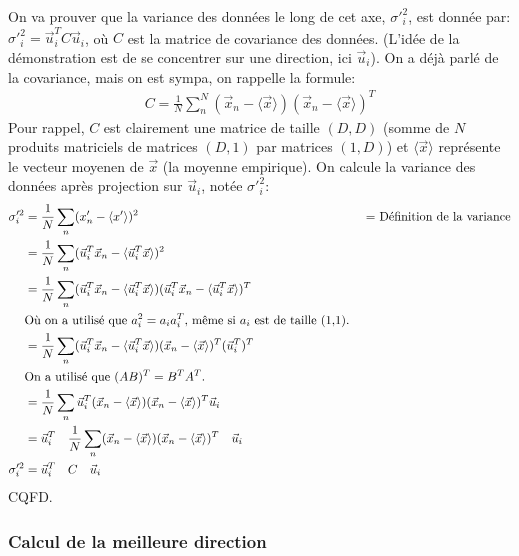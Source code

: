 \documentclass[french,twoside]{article}
\begin{document}
On va prouver que la variance des données le long de cet axe, $\sigma'^2_i$, est donnée par: $\sigma'^2_i = \vec u_i^T C \vec u_i$, où $C$ est la matrice de covariance des données. (L'idée de la démonstration est de se concentrer sur une direction, ici $\vec{u}_i$).
On a déjà parlé de la covariance, mais on est sympa, on rappelle la formule:
\begin{align}
C = \frac{1}{N}\sum_n^N (\vec{x}_n-\langle \vec{x}\rangle) (\vec{x}_n-\langle \vec{x}\rangle) ^T
\end{align}
Pour rappel, $C$ est clairement une matrice de taille $(D,D)$ (somme de $N$ produits matriciels de matrices $(D,1)$ par matrices $(1,D)$) et $\langle \vec{x}\rangle$ représente le vecteur moyenen de $\vec{x}$ (la moyenne empirique).
On calcule la variance des données après projection sur $\vec u_i$, notée $\sigma'^2_i$:
\begin{align}
\sigma'^2_i 
&= \frac{1}{N} \sum_n (x'_n-\langle x'\rangle)^2 & & \text{ = Définition de la variance} \\
&= \frac{1}{N} \sum_n (\vec u_i ^T\vec{x}_n-\langle \vec u_i ^T\vec{x}\rangle)^2 \\
&= \frac{1}{N} \sum_n (\vec u_i ^T\vec{x}_n-\langle \vec u_i ^T\vec{x}\rangle) (\vec u_i ^T\vec{x}_n-\langle \vec u_i ^T\vec{x}\rangle)^T \\
& \text{Où on a utilisé que $a_i^2= a_i a_i^T$, même si $a_i$ est de taille (1,1).}\notag
\\
&= \frac{1}{N} \sum_n (\vec u_i ^T\vec{x}_n-\langle \vec u_i ^T\vec{x}\rangle) (\vec{x}_n-\langle \vec{x}\rangle)^T (\vec u_i ^T)^T\\
& \text{On a utilisé que $(AB)^T = B^T A^T$.} \notag
\\
&= \frac{1}{N} \sum_n \vec u_i^T(\vec{x}_n-\langle \vec{x}\rangle) (\vec{x}_n-\langle \vec{x}\rangle)^T \vec u_i \\
&=  \vec u_i^T \quad \frac{1}{N} \sum_n (\vec{x}_n-\langle \vec{x}\rangle) (\vec{x}_n-\langle \vec{x}\rangle)^T \quad \vec u_i \\
\sigma'^2_i &= \vec u_i^T \quad C \quad \vec u_i
\end{align}
CQFD.

\subsubsection{Calcul de la meilleure direction}
\end{document}
